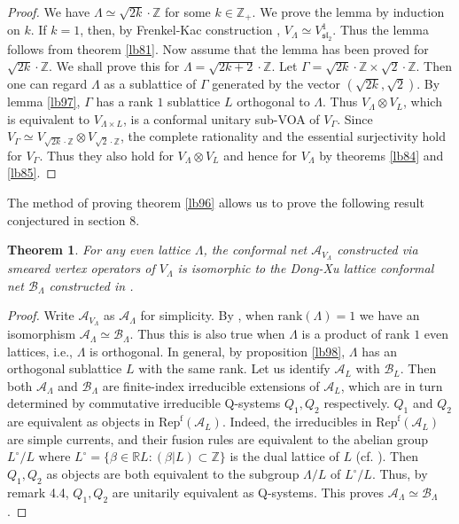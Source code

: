 \documentclass[12pt,a4paper]{article}
\theoremstyle{definition}
\theoremstyle{plain}
\newtheorem{thm}[df]{Theorem}
\newcommand{\fk}{\mathfrak}
\newcommand{\mc}{\mathcal}
\newcommand{\Repf}{\mathrm{Rep}^{\mathrm f}}
\newcommand{\mbb}{\mathbb}
\newcommand{\rank}{\mathrm{rank}}
\numberwithin{equation}{subsection}
\begin{document}
\begin{proof}
We have $\Lambda\simeq \sqrt {2k}\cdot \mbb Z$ for some $k\in\mbb Z_+$. We prove the lemma by induction on $k$. If $k=1$, then, by Frenkel-Kac construction \cite{FK80}, $V_\Lambda\simeq V^1_{\fk{sl}_2}$. Thus the lemma follows from theorem \ref{lb81}. Now assume that the lemma has been proved for $\sqrt {2k}\cdot \mbb Z$. We shall prove this for $\Lambda=\sqrt {2k+2}\cdot\mbb Z$. Let $\Gamma=\sqrt {2k}\cdot\mbb Z\times \sqrt 2\cdot \mbb Z$. Then one can regard $\Lambda$ as a sublattice of $\Gamma$ generated by the vector $(\sqrt{2k},\sqrt 2)$. By lemma \ref{lb97}, $\Gamma$ has a rank $1$ sublattice $L$ orthogonal to $\Lambda$. Thus  $V_\Lambda\otimes V_L$, which is equivalent to $V_{\Lambda\times L}$, is a conformal unitary sub-VOA of $V_\Gamma$. Since $V_\Gamma\simeq V_{\sqrt{2k}\cdot\mbb Z}\otimes V_{\sqrt 2\cdot\mbb Z}$, the complete rationality and the essential surjectivity hold for $V_\Gamma$. Thus they also hold for $V_\Lambda\otimes V_L$ and hence for $V_\Lambda$ by theorems \ref{lb84} and \ref{lb85}.
\end{proof}





The method of proving theorem \ref{lb96} allows us to prove the following result conjectured in \cite{CKLW18} section 8.

\begin{thm}
For any even lattice $\Lambda$, the conformal net $\mc A_{V_\Lambda}$ constructed via smeared vertex operators of $V_\Lambda$ is isomorphic to the Dong-Xu lattice conformal  net $\mc B_\Lambda$ constructed in \cite{DX06}.
\end{thm}


\begin{proof}
Write $\mc A_{V_\Lambda}$ as $\mc A_\Lambda$ for simplicity. By \cite{BMT88}, when $\rank(\Lambda)=1$ we have an isomorphism $\mc A_\Lambda\simeq \mc B_\Lambda$. Thus this is also true when $\Lambda$ is a product of rank $1$ even lattices, i.e., $\Lambda$ is orthogonal. In general, by proposition \ref{lb98}, $\Lambda$ has an orthogonal sublattice $L$ with the same rank. Let us identify $\mc A_L$ with $\mc B_L$. Then both $\mc A_\Lambda$ and $\mc B_\Lambda$ are finite-index irreducible extensions of $\mc A_L$, which are in turn determined by  commutative irreducible Q-systems $Q_1,Q_2$ respectively. $Q_1$ and $Q_2$ are equivalent as objects in $\Repf(\mc A_L)$. Indeed, the irreducibles in $\Repf(\mc A_L)$ are simple currents, and their fusion rules are equivalent to the abelian group $L^\circ/L$ where $L^\circ=\{\beta\in\mbb RL:(\beta|L)\subset\mbb Z \}$ is the dual lattice of $L$ (cf. \cite{DX06}). Then $Q_1,Q_2$ as objects are both equivalent to the subgroup $\Lambda/L$ of $L^\circ/L$. Thus,  by \cite{KL06} remark 4.4, $Q_1,Q_2$ are unitarily equivalent as Q-systems. This proves $\mc A_\Lambda\simeq\mc B_\Lambda$.
\end{proof}
\end{document}

